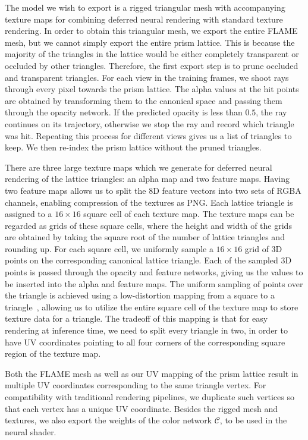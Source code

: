 The model we wish to export is a rigged triangular mesh with accompanying texture maps for combining deferred neural rendering with standard texture rendering. In order to obtain this triangular mesh, we export the entire FLAME mesh, but we cannot simply export the entire prism lattice. This is because the majority of the triangles in the lattice would be either completely transparent or occluded by other triangles. Therefore, the first export step is to prune occluded and transparent triangles. For each view in the training frames, we shoot rays through every pixel towards the prism lattice. The alpha values at the hit points are obtained by transforming them to the canonical space and passing them through the opacity network. If the predicted opacity is less than $0.5$, the ray continues on its trajectory, otherwise we stop the ray and record which triangle was hit. Repeating this process for different views gives us a list of triangles to keep. We then re-index the prism lattice without the pruned triangles.

There are three large texture maps which we generate for deferred neural rendering of the lattice triangles: an alpha map and two feature maps. Having two feature maps allows us to split the 8D feature vectors into two sets of RGBA channels, enabling compression of the textures as PNG. Each lattice triangle is assigned to a $16\times 16$ square cell of each texture map. The texture maps can be regarded as grids of these square cells, where the height and width of the grids are obtained by taking the square root of the number of lattice triangles and rounding up. For each square cell, we uniformly sample a $16\times 16$ grid of 3D points on the corresponding canonical lattice triangle. Each of the sampled 3D points is passed through the opacity and feature networks, giving us the values to be inserted into the alpha and feature maps. 
The uniform sampling of points over the triangle is achieved using a low-distortion mapping from a square to a triangle~\cite{heitz2019low}, allowing us to utilize the entire square cell of the texture map to store texture data for a triangle. The tradeoff of this mapping is that for easy rendering at inference time, we need to split every triangle in two, in order to have UV coordinates pointing to all four corners of the corresponding square region of the texture map. 

Both the FLAME mesh as well as our UV mapping of the prism lattice result in multiple UV coordinates corresponding to the same triangle vertex. For compatibility with traditional rendering pipelines, we duplicate such vertices so that each vertex has a unique UV coordinate. Besides the rigged mesh and textures, we also export the weights of the color network $\mathcal{C}$, to be used in the neural shader.

